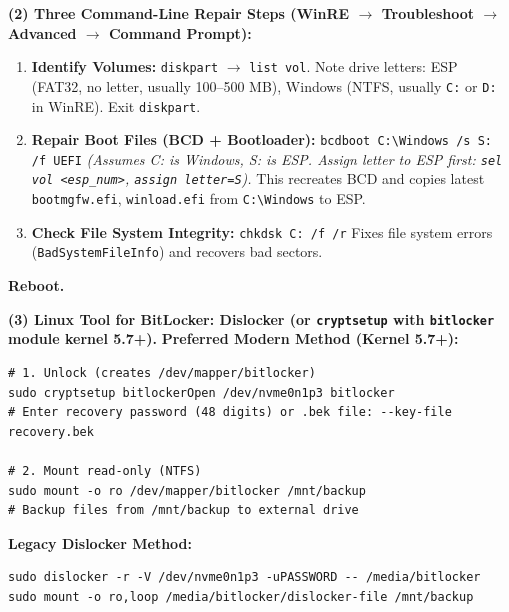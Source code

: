 \documentclass[11pt]{article}
\newcommand{\cle}[1]{{\popxbold\color{popdark}#1}}
\begin{document}
\begin{exoresolu}
\noindent\textbf{(2) Three Command-Line Repair Steps (WinRE $\rightarrow$ Troubleshoot $\rightarrow$ Advanced $\rightarrow$ Command Prompt):}
\begin{enumerate}
    \item \textbf{Identify Volumes:} \texttt{diskpart} $\rightarrow$ \texttt{list vol}. Note drive letters: ESP (FAT32, no letter, usually 100--500 MB), Windows (NTFS, usually \texttt{C:} or \texttt{D:} in WinRE). Exit \texttt{diskpart}.
    \item \textbf{Repair Boot Files (BCD + Bootloader):}
    \texttt{bcdboot C:\textbackslash Windows /s S: /f UEFI}
    \emph{(Assumes C: is Windows, S: is ESP. Assign letter to ESP first: \texttt{sel vol <esp\_num>}, \texttt{assign letter=S}).}
    This recreates BCD and copies latest \texttt{bootmgfw.efi}, \texttt{winload.efi} from \texttt{C:\textbackslash Windows} to ESP.
    \item \textbf{Check File System Integrity:}
    \texttt{chkdsk C: /f /r}
    Fixes file system errors (\texttt{BadSystemFileInfo}) and recovers bad sectors.
\end{enumerate}
\textbf{Reboot.}

\noindent\textbf{(3) Linux Tool for BitLocker: \cle{Dislocker} (or \texttt{cryptsetup} with \texttt{bitlocker} module kernel 5.7+).}
\textbf{Preferred Modern Method (Kernel 5.7+):}
\begin{verbatim}
# 1. Unlock (creates /dev/mapper/bitlocker)
sudo cryptsetup bitlockerOpen /dev/nvme0n1p3 bitlocker
# Enter recovery password (48 digits) or .bek file: --key-file recovery.bek

# 2. Mount read-only (NTFS)
sudo mount -o ro /dev/mapper/bitlocker /mnt/backup
# Backup files from /mnt/backup to external drive
\end{verbatim}
\textbf{Legacy Dislocker Method:}
\begin{verbatim}
sudo dislocker -r -V /dev/nvme0n1p3 -uPASSWORD -- /media/bitlocker
sudo mount -o ro,loop /media/bitlocker/dislocker-file /mnt/backup
\end{verbatim}


\end{exoresolu}
\end{document}
